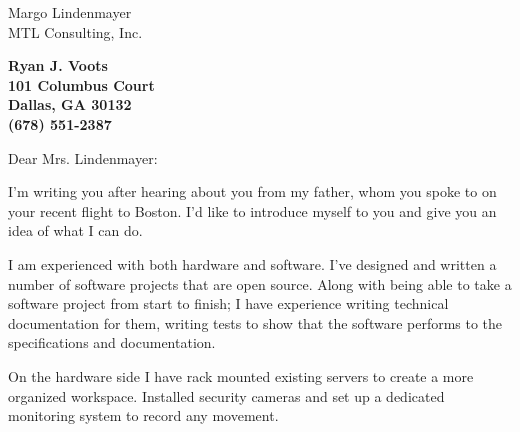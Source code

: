 \documentclass[11pt]{letter} %
\newcommand{\comment}[1]{} %
\begin{document}
\signature{Ryan Voots}                  %
\longindentation=0pt                       %
\let\raggedleft\raggedright                %
 
\begin{letter}{
Margo Lindenmayer \\
MTL Consulting, Inc.}

\begin{center}
\large\bf Ryan J. Voots \\
101 Columbus Court \\ Dallas, GA 30132 \\ (678) 551-2387
\end{center} 
\vfill %

\opening{Dear Mrs. Lindenmayer:}

I'm writing you after hearing about you from my father, whom you spoke to on your recent flight to Boston.
I'd like to introduce myself to you and give you an idea of what I can do.

\comment{\noindent PARAGRAPH ONE: State reason for letter, name the position or type
of work you are applying for and identify source from  which  you 
learned   of   the  opening.  (i.e.  Career  Development  Center, 
newspaper, employment service, personal contact).}

I am experienced with both hardware and software.
I've designed and written a number of software projects that are open source.
Along with being able to take a software project from start to finish; I have experience writing technical documentation for them, writing tests to show that the software performs to the specifications and documentation.

On the hardware side I have rack mounted existing servers to create a more organized workspace.  Installed security cameras and set up a dedicated monitoring system to record any movement.

\comment{\noindent PARAGRAPH  TWO:  Indicate why you are interested in the position,
the company, its products, services - above all, stress what you 
can  do  for  the employer. If you are a recent graduate, explain  how
your academic background makes you a qualified candidate for the
position. If  you have practical work experience, point out 
specific achievements or unique qualifications. Try not to repeat 
the  same  information  the reader will find in the resume. Refer 
the reader to the enclosed resume or application which summarizes 
your  qualifications,  training,  and experiences. The purpose of 
this section is to strengthen your resume  by  providing  details 
which bring your experiences to life. }


\end{letter}
\end{document}
